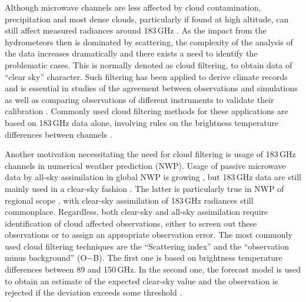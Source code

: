 \documentclass[amt, manuscript]{copernicus}
\begin{document}
Although microwave channels are less affected by cloud contamination, precipitation and most dense clouds, particularly if found at high altitude, can
still affect measured radiances around 183\,GHz
\citep[e.g.][]{bennartz2003sensitivity}. As the impact from the hydrometeors
then is dominated by scattering, the complexity of the analysis of the data
increases dramatically and there exists a need to identify the problematic
cases. This is normally denoted as cloud filtering, to obtain data of ``clear
sky'' character. Such filtering has been applied to derive climate records
\citep{lang2020new} and is essential in studies of the agreement between
observations and simulations \citep{brogniez2016review} as well as 
comparing observations of different instruments to validate their calibration
\citep{john2013assessment,moradi:retri:15,berg2016intercalibration}. Commonly
used cloud filtering methods for these applications are based on 183\,GHz data alone, involving rules on the brightness temperature differences between channels \citep{burns1997effects, buehler:aclou:07}.


Another motivation necessitating the need for cloud filtering is usage of 183\,GHz channels in 
numerical weather prediction (NWP). Usage of passive microwave data by
all-sky assimilation in global NWP is growing \citep{geer2017growing},
but 183\,GHz data are still mainly used in a clear-sky fashion
\citep{geer2018all}. The latter is particularly true in NWP of regional scope
\citep{gustafsson2018survey}, with clear-sky assimilation of 183\,GHz radiances still commonplace. Regardless, both clear-sky and all-sky assimilation require identification of cloud affected observations, either to screen out these observations or to assign an appropriate observation error. The most commonly used cloud filtering techniques are the ``Scattering index'' \citep{geer2015scatteringindex} and the ``observation minus background'' (O$-$B). The first one is based on brightness temperature differences between 89 and 150\,GHz. In the second one, the forecast model is used to obtain an estimate of the expected clear-sky value and the observation is rejected if the deviation exceeds some threshold \citep{English1999clouddetection}. 
\end{document}
